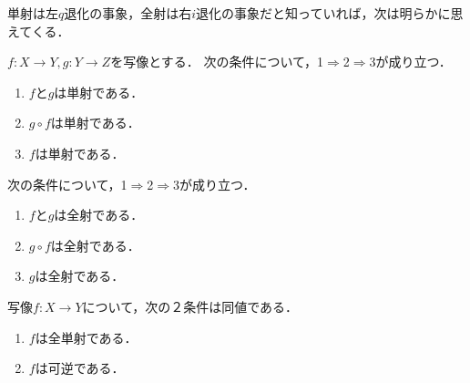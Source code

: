 \documentclass[uplatex,dvipdfmx]{jsreport}
\begin{document}
単射は左$q$退化の事象，全射は右$i$退化の事象だと知っていれば，次は明らかに思えてくる．
\begin{lemma}
    $f:X\to Y, g:Y\to Z$を写像とする．
    次の条件について，1$\Rightarrow$2$\Rightarrow$3が成り立つ．
    \begin{enumerate}
        \item $f$と$g$は単射である．
        \item $g\circ f$は単射である．
        \item $f$は単射である．
    \end{enumerate}
    次の条件について，1$\Rightarrow$2$\Rightarrow$3が成り立つ．
    \begin{enumerate}
        \item $f$と$g$は全射である．
        \item $g\circ f$は全射である．
        \item $g$は全射である．
    \end{enumerate}
\end{lemma}

\begin{proposition}
    写像$f:X\to Y$について，次の２条件は同値である．
    \begin{enumerate}
        \item $f$は全単射である．
        \item $f$は可逆である．
    \end{enumerate}
\end{proposition}
\end{document}
